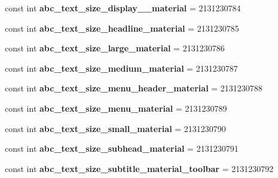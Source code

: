 \begin{DoxyCompactItemize}
const int {\bfseries abc\+\_\+text\+\_\+size\+\_\+display\+\_\+\_\+material} = 2131230784
\item 
\mbox{\label{classst_delivery_1_1_resource_1_1_dimension_a09a1fdc272fec4cc4f9f0382e17359cd}} 
const int {\bfseries abc\+\_\+text\+\_\+size\+\_\+headline\+\_\+material} = 2131230785
\item 
\mbox{\label{classst_delivery_1_1_resource_1_1_dimension_a51d41ce824d2398f47abd7192aff39d5}} 
const int {\bfseries abc\+\_\+text\+\_\+size\+\_\+large\+\_\+material} = 2131230786
\item 
\mbox{\label{classst_delivery_1_1_resource_1_1_dimension_a9b6dacb943a0dcf6be1accdaf0a6fd0f}} 
const int {\bfseries abc\+\_\+text\+\_\+size\+\_\+medium\+\_\+material} = 2131230787
\item 
\mbox{\label{classst_delivery_1_1_resource_1_1_dimension_a761cde484518bcf87d5a44e9c68f9b55}} 
const int {\bfseries abc\+\_\+text\+\_\+size\+\_\+menu\+\_\+header\+\_\+material} = 2131230788
\item 
\mbox{\label{classst_delivery_1_1_resource_1_1_dimension_aca6ec3359597818dbb795dc332bc7f54}} 
const int {\bfseries abc\+\_\+text\+\_\+size\+\_\+menu\+\_\+material} = 2131230789
\item 
\mbox{\label{classst_delivery_1_1_resource_1_1_dimension_a3a51aff9a5ae10aa12a77748092cfc73}} 
const int {\bfseries abc\+\_\+text\+\_\+size\+\_\+small\+\_\+material} = 2131230790
\item 
\mbox{\label{classst_delivery_1_1_resource_1_1_dimension_a74a637d845634daf566784fd05e1c3c2}} 
const int {\bfseries abc\+\_\+text\+\_\+size\+\_\+subhead\+\_\+material} = 2131230791
\item 
\mbox{\label{classst_delivery_1_1_resource_1_1_dimension_a7801fa0549afc8509d578425785523fd}} 
const int {\bfseries abc\+\_\+text\+\_\+size\+\_\+subtitle\+\_\+material\+\_\+toolbar} = 2131230792

\end{DoxyCompactItemize}
